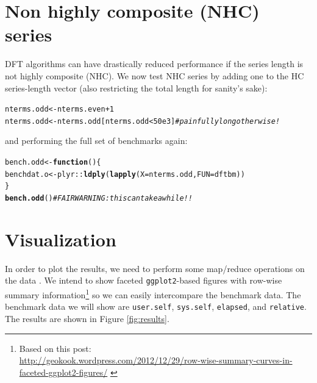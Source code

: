 \documentclass[10pt]{article}\usepackage[]{graphicx}\usepackage[]{color}
\makeatletter
\newcommand{\hlnum}[1]{\textcolor[rgb]{0.686,0.059,0.569}{#1}}%
\newcommand{\hlcom}[1]{\textcolor[rgb]{0.678,0.584,0.686}{\textit{#1}}}%
\newcommand{\hlopt}[1]{\textcolor[rgb]{0,0,0}{#1}}%
\newcommand{\hlstd}[1]{\textcolor[rgb]{0.345,0.345,0.345}{#1}}%
\newcommand{\hlkwa}[1]{\textcolor[rgb]{0.161,0.373,0.58}{\textbf{#1}}}%
\newcommand{\hlkwb}[1]{\textcolor[rgb]{0.69,0.353,0.396}{#1}}%
\newcommand{\hlkwc}[1]{\textcolor[rgb]{0.333,0.667,0.333}{#1}}%
\newcommand{\hlkwd}[1]{\textcolor[rgb]{0.737,0.353,0.396}{\textbf{#1}}}%
\newenvironment{kframe}{%
 \def\at@end@of@kframe{}%
 \ifinner\ifhmode%
  \def\at@end@of@kframe{\end{minipage}}%
  \begin{minipage}{\columnwidth}%
 \fi\fi%
 \def\FrameCommand##1{\hskip\@totalleftmargin \hskip-\fboxsep
 \colorbox{shadecolor}{##1}\hskip-\fboxsep
     \hskip-\linewidth \hskip-\@totalleftmargin \hskip\columnwidth}%
 \MakeFramed {\advance\hsize-\width
   \@totalleftmargin\z@ \linewidth\hsize
   \@setminipage}}%
 {\par\unskip\endMakeFramed%
 \at@end@of@kframe}
\newenvironment{knitrout}{}{} %
\newcommand{\Rcmd}[1]{\texttt{#1}}
\makeatother
\begin{document}
\section{Non highly composite (NHC) series}
DFT algorithms can have drastically reduced performance
if the series length is not highly composite (NHC).
We now test NHC series by adding one to the HC series-length
vector (also restricting the total length for sanity's sake):
\begin{knitrout}
\color{fgcolor}\begin{kframe}
\begin{alltt}
\hlstd{nterms.odd} \hlkwb{<-} \hlstd{nterms.even} \hlopt{+} \hlnum{1}
\hlstd{nterms.odd} \hlkwb{<-} \hlstd{nterms.odd[nterms.odd} \hlopt{<} \hlnum{50e3}\hlstd{]} \hlcom{# painfully long otherwise!}
\end{alltt}
\end{kframe}
\end{knitrout}
and performing the full set of benchmarks again:
\begin{knitrout}
\color{fgcolor}\begin{kframe}
\begin{alltt}
\hlstd{bench.odd} \hlkwb{<-} \hlkwa{function}\hlstd{()\{}
  \hlstd{benchdat.o} \hlkwb{<-} \hlstd{plyr}\hlopt{::}\hlkwd{ldply}\hlstd{(}\hlkwd{lapply}\hlstd{(}\hlkwc{X}\hlstd{=nterms.odd,} \hlkwc{FUN}\hlstd{=dftbm))}
  \hlstd{\}}
\hlkwd{bench.odd}\hlstd{()} \hlcom{# FAIR WARNING: this can take a while!!}
\end{alltt}
\end{kframe}
\end{knitrout}

\section{Visualization}
In order to plot the results, we need to 
perform some map/reduce operations on the data
\citep{wickham2010}. We intend to show faceted \Rcmd{ggplot2}-based
figures with row-wise summary information\footnote{
Based on this post:\\
{\small
\url{http://geokook.wordpress.com/2012/12/29/row-wise-summary-curves-in-faceted-ggplot2-figures/}
}
} so we can easily intercompare the benchmark data.
The benchmark data we will show
are \Rcmd{user.self}, \Rcmd{sys.self}, \Rcmd{elapsed}, and \Rcmd{relative}.
The results are shown
in Figure \ref{fig:results}.
\end{document}
